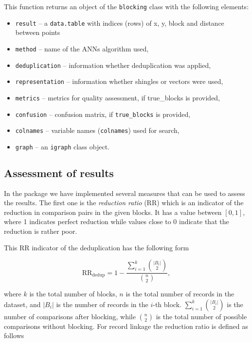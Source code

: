 This function returns an object of the \texttt{blocking} class with the
following elements:

\begin{itemize}
\tightlist
\item
  \texttt{result} -- a \texttt{data.table} with indices (rows) of x, y, block and
  distance between points
\item
  \texttt{method} -- name of the ANNs algorithm used,
\item
  \texttt{deduplication} -- information whether deduplication was applied,
\item
  \texttt{representation} -- information whether shingles or vectors were
  used,
\item
  \texttt{metrics} -- metrics for quality assessment, if true\_blocks is
  provided,
\item
  \texttt{confusion} -- confusion matrix, if \texttt{true\_blocks} is provided,
\item
  \texttt{colnames} -- variable names (\texttt{colnames}) used for search,
\item
  \texttt{graph} -- an \texttt{igraph} class object.
\end{itemize}

\subsection{Assessment of results}\label{sec-assess}

In the package we have implemented several measures that can be used to
assess the results. The first one is the \emph{reduction ratio} (RR) which is
an indicator of the reduction in comparison pairs in the given blocks.
It has a value between \([0,1]\), where 1 indicates perfect reduction
while values close to 0 indicate that the reduction is rather poor.

This RR indicator of the deduplication has the following form

\[
\text{RR}_{\text{dedup}} = 1 - \frac{\sum\limits_{i=1}^{k} \binom{|B_i|}{2}}{\binom{n}{2}},
\]

\noindent where \(k\) is the total number of blocks, \(n\) is the total
number of records in the dataset, and \(|B_i|\) is the number of records
in the \(i\)-th block. \(\sum\limits_{i=1}^{k} \binom{|B_i|}{2}\) is the
number of comparisons after blocking, while \(\binom{n}{2}\) is the total
number of possible comparisons without blocking. For record linkage the
reduction ratio is defined as follows

